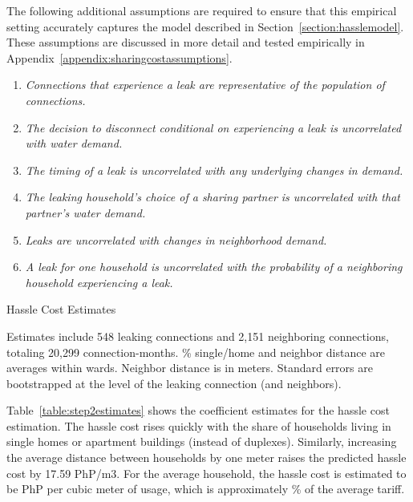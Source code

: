 \documentclass[12pt]{article}
\begin{document}
The following additional assumptions are required to ensure that this empirical setting accurately captures the model described in Section~\ref{section:hasslemodel}.  These assumptions are discussed in more detail and tested empirically in Appendix~\ref{appendix:sharingcostassumptions}.
\begin{enumerate}
	\item \textit{ Connections that experience a leak are representative of the population of connections. } 
	\item \textit{ The decision to disconnect conditional on experiencing a leak is uncorrelated with water demand. } 
	\item \textit{ The timing of a leak is uncorrelated with any underlying changes in demand. } 
	\item \textit{ The leaking household's choice of a sharing partner is uncorrelated with that partner's water demand.  }	
	\item \textit{ Leaks are uncorrelated with changes in neighborhood demand. }
	\item \textit{ A leak for one household is uncorrelated with the probability of a neighboring household experiencing a leak. }
\end{enumerate}


\begin{table}
\centering
\begin{threeparttable}
\caption{Hassle Cost Estimates}\label{table:step2estimates}

\begin{tablenotes}
\item \footnotesize{Estimates include 548 leaking connections and 2,151 neighboring connections, totaling 20,299 connection-months.  \% single/home and neighbor distance are averages within wards.  Neighbor distance is in meters.   Standard errors are bootstrapped at the level of the leaking connection (and neighbors). }
\end{tablenotes}
\end{threeparttable}
\end{table}

Table~\ref{table:step2estimates} shows the coefficient estimates for the hassle cost estimation.  The hassle cost rises quickly with the share of households living in single homes or apartment buildings (instead of duplexes).  Similarly, increasing the average distance between households by one meter raises the predicted hassle cost by 17.59 PhP/m3.  For the average household, the hassle cost is estimated to be PhP per cubic meter of usage, which is approximately \unskip\% of the average tariff.  
\end{document}
